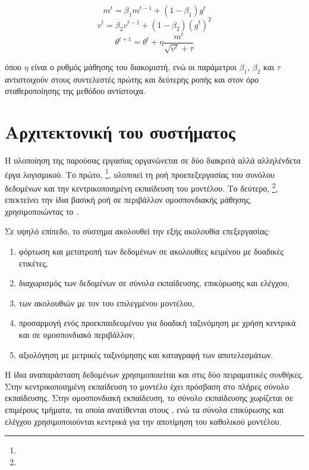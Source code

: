 \[
m^t
=
\beta_1m^{t-1}
+
(1-\beta_1)g^t
\]
\[
v^t
=
\beta_2v^{t-1}
+
(1-\beta_2)(g^t)^2
\]
\[
\theta^{t+1}
=
\theta^t
+
\eta
\frac{m^t}
{\sqrt{v^t}+\tau}
\]

όπου $\eta$ είναι ο ρυθμός μάθησης του διακομιστή, ενώ οι παράμετροι $\beta_1$, $\beta_2$ και $\tau$ αντιστοιχούν στους συντελεστές πρώτης και δεύτερης ροπής και στον όρο σταθεροποίησης της μεθόδου αντίστοιχα.

\section{Αρχιτεκτονική του συστήματος}

Η υλοποίηση της παρούσας εργασίας οργανώνεται σε δύο διακριτά αλλά αλληλένδετα έργα λογισμικού. Το πρώτο, \footnote{}, υλοποιεί τη ροή προεπεξεργασίας του συνόλου δεδομένων και την κεντρικοποιημένη εκπαίδευση του μοντέλου. Το δεύτερο, \footnote{}, επεκτείνει την ίδια βασική ροή σε περιβάλλον ομοσπονδιακής μάθησης, χρησιμοποιώντας το .

Σε υψηλό επίπεδο, το σύστημα ακολουθεί την εξής ακολουθία επεξεργασίας:
\begin{enumerate}

\item φόρτωση και μετατροπή των δεδομένων  σε ακολουθίες κειμένου με δυαδικές ετικέτες,

\item διαχωρισμός των δεδομένων σε σύνολα εκπαίδευσης, επικύρωσης και ελέγχου,

\item {} των ακολουθιών με τον  του επιλεγμένου μοντέλου,

\item προσαρμογή ενός προεκπαιδευμένου  για δυαδική ταξινόμηση με χρήση  κεντρικά και σε ομοσπονδιακό περιβάλλον,

\item αξιολόγηση με μετρικές ταξινόμησης και καταγραφή των αποτελεσμάτων.

\end{enumerate}

  

Η ίδια αναπαράσταση δεδομένων χρησιμοποιείται και στις δύο πειραματικές συνθήκες. Στην κεντρικοποιημένη εκπαίδευση το μοντέλο έχει πρόσβαση στο πλήρες σύνολο εκπαίδευσης. Στην ομοσπονδιακή εκπαίδευση, το σύνολο εκπαίδευσης χωρίζεται σε επιμέρους τμήματα, τα οποία ανατίθενται στους , ενώ τα σύνολα επικύρωσης και ελέγχου χρησιμοποιούνται κεντρικά για την αποτίμηση του καθολικού μοντέλου.


